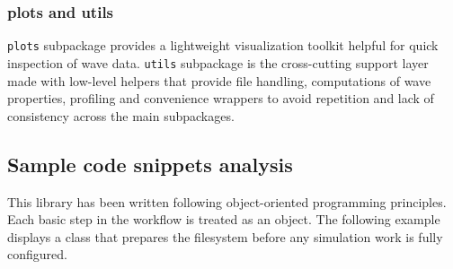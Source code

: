\documentclass[preprint,12pt, a4paper]{elsarticle}
\begin{document}
\subsubsection{plots and utils}
\texttt{plots} subpackage provides a lightweight visualization toolkit helpful for quick inspection of wave data. \texttt{utils} subpackage is the cross-cutting support layer made with low-level helpers that provide file handling, computations of wave properties, profiling and convenience wrappers to avoid repetition and lack of consistency across the main subpackages.
  
 \subsection{Sample code snippets analysis}
This library has been written following object-oriented programming principles. Each basic step in the workflow is treated as an object. The following example displays a class that prepares the filesystem before any simulation work is fully configured.
\end{document}
